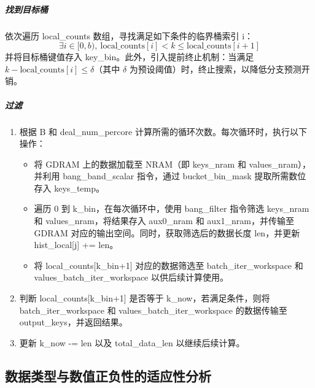 \subparagraph{找到目标桶}

依次遍历 local\_counts 数组，寻找满足如下条件的临界桶索引 i：
\begin{equation}
\exists i \in [0,b),\ \text{local\_counts}[i] < k \leqslant \text{local\_counts}[i+1]
\end{equation}
并将目标桶键值存入 key\_bin。此外，引入提前终止机制：当满足 $ k - \text{local\_counts}[i] \leqslant \delta $（其中 $\delta$ 为预设阈值）时，终止搜索，以降低分支预测开销。

\subparagraph{过滤}

\begin{enumerate}
    \item 根据 B 和 deal\_num\_percore 计算所需的循环次数。每次循环时，执行以下操作：
    \begin{itemize}
        \item 将 GDRAM 上的数据加载至 NRAM（即 keys\_nram 和 values\_nram），并利用 bang\_band\_scalar 指令，通过 bucket\_bin\_mask 提取所需数位存入 keys\_temp。
        \item 遍历 0 到 k\_bin，在每次循环中，使用 bang\_filter 指令筛选 keys\_nram 和 values\_nram，将结果存入 aux0\_nram 和 aux1\_nram，并传输至 GDRAM 对应的输出空间。同时，获取筛选后的数据长度 len，并更新 hist\_local[j] += len。
        \item 将 local\_counts[k\_bin+1] 对应的数据筛选至 batch\_iter\_workspace 和 values\_batch\_iter\_workspace 以供后续计算使用。
    \end{itemize}
    
    \item 判断 local\_counts[k\_bin+1] 是否等于 k\_now，若满足条件，则将 batch\_iter\_workspace 和 values\_batch\_iter\_workspace 的数据传输至 output\_keys，并返回结果。

    \item 更新 k\_now -= len 以及 total\_data\_len 以继续后续计算。
\end{enumerate}







\subsection{数据类型与数值正负性的适应性分析}


